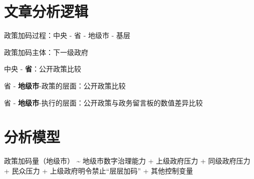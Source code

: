 \documentclass[
  12pt,
]{ctexart}
\begin{document}
\hypertarget{ux6587ux7ae0ux5206ux6790ux903bux8f91}{%
\section{文章分析逻辑}\label{ux6587ux7ae0ux5206ux6790ux903bux8f91}}

政策加码过程：中央 - 省 - 地级市 - 基层

政策加码主体：下一级政府

中央 - \textbf{省}：公开政策比较

省 - \textbf{地级市}-政策的层面：公开政策比较

省 - \textbf{地级市}-执行的层面：公开政策与政务留言板的数值差异比较

\hypertarget{ux5206ux6790ux6a21ux578b}{%
\section{分析模型}\label{ux5206ux6790ux6a21ux578b}}

政策加码量（地级市） \textasciitilde{} 地级市数字治理能力 + 上级政府压力 + 同级政府压力 + 民众压力 + 上级政府明令禁止``层层加码'' + 其他控制变量
\end{document}
